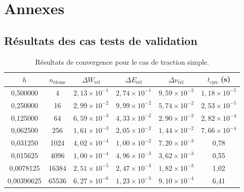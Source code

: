 \documentclass[a4paper,11pt]{article}
\begin{document}
\clearpage
\section*{Annexes}
\appendix

\subsection*{Résultats des cas tests de validation}
\begin{table}[H]
    \centering
    \footnotesize
    \begin{tabular}{|c|c|c|c|c|c|}
        \hline
        $h$ & $n_{\text{elems}}$ & $\Delta W_{\text{rel}}$ & $\Delta E_{\text{rel}}$ & $\Delta \nu_{\text{rel}}$ & $t_{\text{cpu}}$ (s) \\
        \hline
        0,500000 & 4 & $2,13\times10^{-1}$ & $2,74\times10^{-1}$ & $9,59\times10^{-2}$ & $1,18\times10^{-5}$ \\
        0,250000 & 16 & $2,99\times10^{-2}$ & $9,99\times10^{-2}$ & $5,74\times10^{-2}$ & $2,53\times10^{-5}$ \\
        0,125000 & 64 & $6,59\times10^{-3}$ & $4,33\times10^{-2}$ & $2,90\times10^{-2}$ & $2,82\times10^{-4}$ \\
        0,062500 & 256 & $1,61\times10^{-3}$ & $2,05\times10^{-2}$ & $1,44\times10^{-2}$ & $7,66\times10^{-4}$ \\
        0,031250 & 1024 & $4,02\times10^{-4}$ & $1,00\times10^{-2}$ & $7,20\times10^{-3}$ & 0,78 \\
        0,015625 & 4096 & $1,00\times10^{-4}$ & $4,96\times10^{-3}$ & $3,62\times10^{-3}$ & 0,55 \\
        0,0078125 & 16384 & $2,51\times10^{-5}$ & $2,47\times10^{-3}$ & $1,82\times10^{-3}$ & 1,02 \\
        0,00390625 & 65536 & $6,27\times10^{-6}$ & $1,23\times10^{-3}$ & $9,10\times10^{-4}$ & 6,41 \\
        \hline
    \end{tabular}%
    \caption{Résultats de convergence pour le cas de traction simple.}
    \label{tab:validation_traction}
\end{table}
\end{document}
